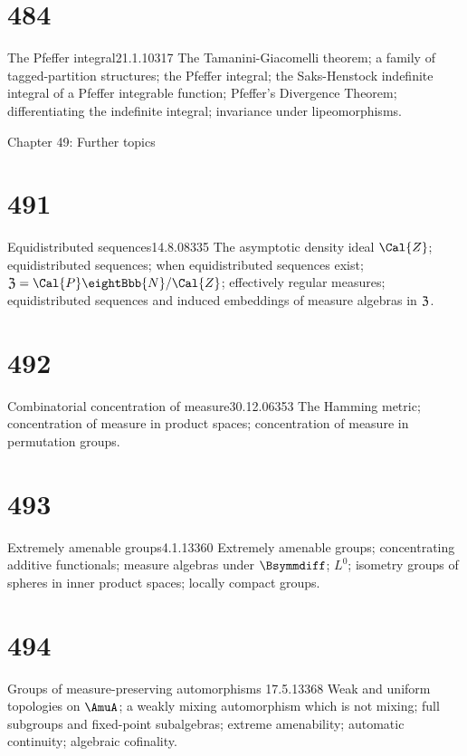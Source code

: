 \section{484}{The Pfeffer integral}{21.1.10}{317}{}
{The Tamanini-Giacomelli theorem;
a family of tagged-partition structures;  the Pfeffer integral;  the
Saks-Henstock indefinite integral of a Pfeffer integrable function;
Pfeffer's Divergence
Theorem;  differentiating the indefinite integral;  invariance under
lipeomorphisms.}


 Chapter 49:  Further topics


\section{491}{Equidistributed sequences}{14.8.08}{335}{}
{The asymptotic density ideal $\Cal{Z}$;  equidistributed sequences;
when equidistributed sequences exist;
$\frak{Z}=\Cal{P}\eightBbb{N}/\Cal{Z}$;
effectively regular measures;  equidistributed sequences and induced
embeddings of measure algebras in $\frak{Z}$.}

\section{492}{Combinatorial concentration of measure}{30.12.06}{353}{}
{The Hamming metric;
concentration of measure in product spaces;  concentration of measure
in permutation groups.}

\section{493}{Extremely amenable groups}{4.1.13}{360}{}
{Extremely amenable groups;  concentrating additive functionals;
measure algebras under $\Bsymmdiff$;  $L^0$;
isometry groups of spheres in inner product spaces;
locally compact groups.}

\section{494}{Groups of measure-preserving automorphisms}
{17.5.13}{368}{}
{Weak and uniform topologies on $\AmuA$;  a weakly mixing automorphism
which is not mixing;  full subgroups and fixed-point
subalgebras;  extreme
amenability;  automatic continuity;  algebraic cofinality.}

